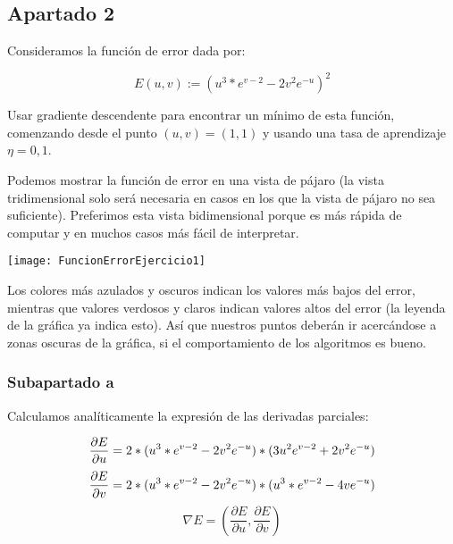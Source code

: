 \documentclass[11pt]{article}
\begin{document}
\subsection{Apartado 2}
\label{seccion:Apartado2}

Consideramos la función de error dada por:

\begin{displaymath}
    E(u, v) := (u^3 * e^{v-2} - 2v^2 e^{-u})^2
\end{displaymath}

Usar gradiente descendente para encontrar un mínimo de esta función, comenzando desde el punto $(u, v) = (1, 1)$ y
usando una tasa de aprendizaje $\eta = 0,1$.

Podemos mostrar la función de error en una vista de pájaro (la vista tridimensional solo será necesaria en casos en los que la vista de pájaro no sea suficiente). Preferimos esta vista bidimensional porque es más rápida de computar y en muchos casos más fácil de interpretar.

\texttt{[image: FuncionErrorEjercicio1]}

Los colores más azulados y oscuros indican los valores más bajos del error, mientras que valores verdosos y claros indican valores altos del error (la leyenda de la gráfica ya indica esto). Así que nuestros puntos deberán ir acercándose a zonas oscuras de la gráfica, si el comportamiento de los algoritmos es bueno.


\subsubsection{Subapartado a}

Calculamos analíticamente la expresión de las derivadas parciales:

\begin{displaymath}
    \frac{\partial E}{\partial u} = 2 * (u^3 * e^{v-2} - 2v^2 e^{-u}) * (3u^2 e^{v-2} + 2v^2 e^{-u}) \\
\end{displaymath}
\begin{displaymath}
    \frac{\partial E}{\partial v} = 2 * (u^3 * e^{v-2} - 2v^2 e^{-u}) * (u^3 * e^{v-2} - 4v e^{-u})  \\
\end{displaymath}
\begin{displaymath}
    \nabla E = (\frac{\partial E}{\partial u}, \frac{\partial E}{\partial v})
\end{displaymath}
\end{document}
